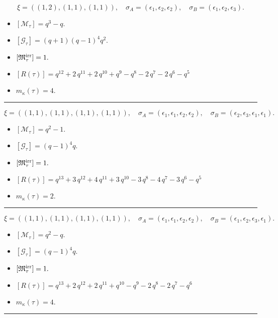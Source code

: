 \documentclass[10pt,a4paper]{amsart}
\begin{document}
$$\xi = ({(1, 2), (1, 1)}, {(1, 1)}),\quad \sigma_A = ({{\epsilon_1}, {\epsilon_2}}, {{\epsilon_2}}),\quad \sigma_B = ({{\epsilon_1}, {\epsilon_2}}, {{\epsilon_3}}).$$

\begin{itemize}
 \item $[\mathcal{M}_{\tau}] = q^{3} - q .$

 \item $[\mathcal{G}_{\tau}] = {\left(q + 1\right)} {\left(q - 1\right)}^{4} q^{2} .$

 \item $[{\frak M}_{\tau}^{\textrm{irr}}] = 1 .$

 \item $[R(\tau)] = q^{12} + 2 \, q^{11} + 2 \, q^{10} + q^{9} - q^{8} - 2 \, q^{7} - 2 \, q^{6} - q^{5} $

 \item $m_{\kappa}(\tau) = 4 .$

 \end{itemize}
\noindent\rule{8cm}{0.4pt}

$$\xi = ({(1, 1), (1, 1), (1, 1)}, {(1, 1)}),\quad \sigma_A = ({{\epsilon_1}, {\epsilon_1}, {\epsilon_2}}, {{\epsilon_2}}),\quad \sigma_B = ({{\epsilon_2}, {\epsilon_3}, {\epsilon_1}}, {{\epsilon_1}}).$$

\begin{itemize}
 \item $[\mathcal{M}_{\tau}] = q^{2} - 1 .$

 \item $[\mathcal{G}_{\tau}] = {\left(q - 1\right)}^{4} q .$

 \item $[{\frak M}_{\tau}^{\textrm{irr}}] = 1 .$

 \item $[R(\tau)] = q^{13} + 3 \, q^{12} + 4 \, q^{11} + 3 \, q^{10} - 3 \, q^{8} - 4 \, q^{7} - 3 \, q^{6} - q^{5} $

 \item $m_{\kappa}(\tau) = 2 .$

 \end{itemize}
\noindent\rule{8cm}{0.4pt}

$$\xi = ({(1, 1), (1, 1), (1, 1)}, {(1, 1)}),\quad \sigma_A = ({{\epsilon_1}, {\epsilon_1}, {\epsilon_2}}, {{\epsilon_2}}),\quad \sigma_B = ({{\epsilon_1}, {\epsilon_2}, {\epsilon_3}}, {{\epsilon_1}}).$$

\begin{itemize}
 \item $[\mathcal{M}_{\tau}] = q^{2} - q .$

 \item $[\mathcal{G}_{\tau}] = {\left(q - 1\right)}^{4} q .$

 \item $[{\frak M}_{\tau}^{\textrm{irr}}] = 1 .$

 \item $[R(\tau)] = q^{13} + 2 \, q^{12} + 2 \, q^{11} + q^{10} - q^{9} - 2 \, q^{8} - 2 \, q^{7} - q^{6} $

 \item $m_{\kappa}(\tau) = 4 .$

 \end{itemize}
\noindent\rule{8cm}{0.4pt}
\end{document}
